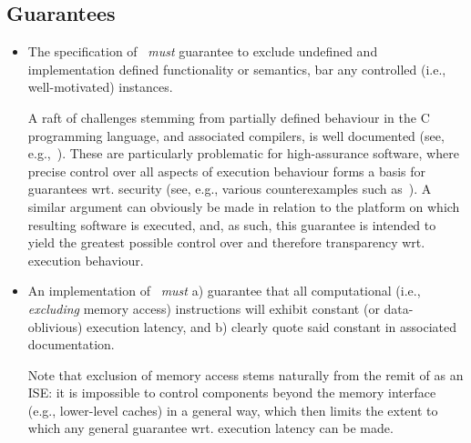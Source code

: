 
\subsection{Guarantees}
\label{sec:bg:guarantee}

\begin{itemize}

\item The  
       specification of \XCRYPTO~{\em must}
      guarantee to exclude
                   undefined 
      and
      implementation defined
      functionality or semantics,
      bar any controlled (i.e., well-motivated) instances.

      A raft of challenges stemming from partially defined behaviour in the
      C programming language, and associated compilers, is well documented
      (see, e.g.,~\cite[Section 2.1]{SCARV:SimChiAnd:18}).
      These are particularly problematic for high-assurance software, where
      precise control over all aspects of execution behaviour forms a basis
      for guarantees wrt. security
      (see, e.g., various counterexamples such as~\cite{SCARV:KPVV:16}).
      A similar argument can obviously be made in relation to the platform 
      on which resulting software is executed, and, as such, this guarantee
      is intended to yield the greatest possible control over and therefore
      transparency wrt. execution behaviour.

\item An  
      implementation of \XCRYPTO~{\em must}
      a) guarantee that all computational 
         (i.e., {\em excluding} memory access) 
         instructions will exhibit constant (or data-oblivious) execution 
         latency,
         and
      b) clearly quote said constant in associated documentation.

      Note that exclusion of memory access stems naturally from the remit
      of \XCRYPTO as an ISE: it is impossible to control components beyond 
      the memory interface 
      (e.g., lower-level caches) 
      in a general way, which then limits the extent to which any general
      guarantee wrt. execution latency can be made.  

\end{itemize}

